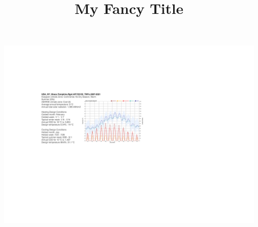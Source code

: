 








\clearpage

\begin{frontmatter}




\title{My Fancy Title}

    

    \begin{abstract}












    \end{abstract}

    \begin{graphicalabstract}
        \includegraphics[width=0.9\linewidth]{images/3_IGND}
    \end{graphicalabstract}


\end{frontmatter}
